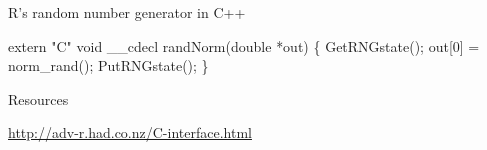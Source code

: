 \documentclass[ignorenonframetext,]{beamer}
\newenvironment{Shaded}{\begin{snugshade}}{\end{snugshade}}
\newcommand{\DataTypeTok}[1]{\textcolor[rgb]{0.13,0.29,0.53}{{#1}}}
\newcommand{\DecValTok}[1]{\textcolor[rgb]{0.00,0.00,0.81}{{#1}}}
\newcommand{\StringTok}[1]{\textcolor[rgb]{0.31,0.60,0.02}{{#1}}}
\newcommand{\NormalTok}[1]{{#1}}
\begin{document}
\begin{frame}[fragile]{R's random number generator in C++}

\begin{Shaded}
\begin{Highlighting}[]
\DataTypeTok{extern} \StringTok{"C"} \DataTypeTok{void} \NormalTok{__cdecl randNorm(}\DataTypeTok{double} \NormalTok{*out)}
\NormalTok{\{}
    \NormalTok{GetRNGstate();}
        \NormalTok{out[}\DecValTok{0}\NormalTok{] = norm_rand();}
        \NormalTok{PutRNGstate();}
\NormalTok{\}}
\end{Highlighting}
\end{Shaded}

\end{frame}

\begin{frame}{Resources}

\url{http://adv-r.had.co.nz/C-interface.html}

\end{frame}
\end{document}
